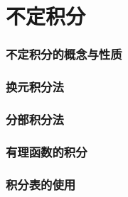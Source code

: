 \documentclass{article}
\begin{document}
  \tableofcontents
  \newpage

  \part{不定积分}
  \section{不定积分的概念与性质}
    
  \section{换元积分法}
    
  \section{分部积分法}
    
  \section{有理函数的积分}
    
  \section{积分表的使用}
    
\end{document}
